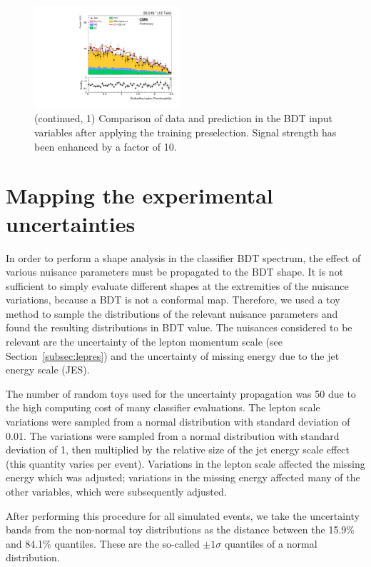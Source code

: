 \begin{figure}[htbp]
\begin{center}
\includegraphics[width=0.48\textwidth]{figures/mva_abs_etal2_nice.pdf}
\caption{(continued, 1) Comparison of data and prediction in the BDT input variables after applying the training preselection. Signal strength has been enhanced by a factor of 10.}
\label{fig:bdt_inputvar_histos2}
\end{center}
\end{figure}


\section{Mapping the experimental uncertainties}
\label{sec:bdt_toys}
In order to perform a shape analysis in the classifier BDT spectrum, the effect of various nuisance parameters must be propagated to the BDT shape.
It is not sufficient to simply evaluate different shapes at the extremities of the nuisance variations, because a BDT is not a conformal map.
Therefore, we used a toy method to sample the distributions of the relevant nuisance parameters and found the resulting distributions in BDT value.
The nuisances considered to be relevant are the uncertainty of the lepton momentum scale (see Section~\ref{subsec:lepres}) and the uncertainty of missing energy due to the jet energy scale (JES).

The number of random toys used for the uncertainty propagation was 50 due to the high computing cost of many classifier evaluations. 
The lepton scale variations were sampled from a normal distribution with standard deviation of 0.01.
The \met variations were sampled from a normal distribution with standard deviation of 1, then multiplied by the relative size of the jet energy scale effect (this quantity varies per event).
Variations in the lepton scale affected the missing energy which was adjusted; variations in the missing energy affected many of the other variables, which were subsequently adjusted. 

After performing this procedure for all simulated events, we take the uncertainty bands from the non-normal toy distributions as the distance between the 15.9\% and 84.1\% quantiles.
These are the so-called $\pm1\sigma$ quantiles of a normal distribution.

